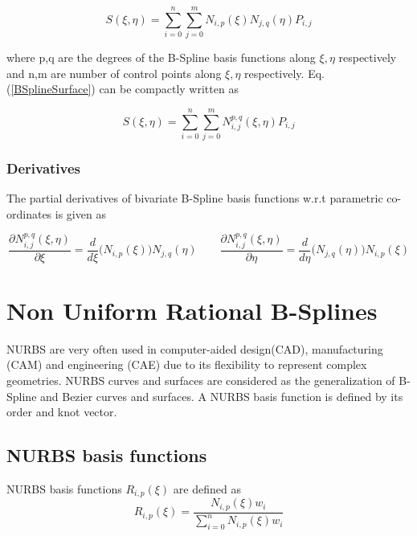 \documentclass[11pt]{article}
\begin{document}
\begin{equation} \label{BSplineSurface}
S(\xi,\eta) = \sum_{i=0}^{n}\sum_{j=0}^{m} N_{i,p}(\xi) N_{j,q}(\eta) P_{i,j}
\end{equation}

\noindent
where
p,q are the degrees of the B-Spline basis functions along $\xi,\eta$
respectively and n,m are number of control points along $\xi,\eta$ respectively.
\noindent
Eq. (\ref{BSplineSurface}) can be compactly written as


\begin{equation} \label{BSplineSurface}
S(\xi,\eta) = \sum_{i=0}^{n}\sum_{j=0}^{m} N_{i,j}^{p,q}(\xi,\eta) P_{i,j}
\end{equation}

\subsubsection{Derivatives}

The partial derivatives of bivariate B-Spline basis functions w.r.t parametric
co-ordinates is given as \cite{nguyen2012introduction}

\begin{equation} 
\frac{\partial N_{i,j}^{p,q}(\xi,\eta)}{\partial \xi} = \frac{d}{d\xi}
\bigg(N_{i,p}(\xi)\bigg)N_{j,q}(\eta) 
\qquad
\frac{\partial N_{i,j}^{p,q}(\xi,\eta)}{\partial \eta} = \frac{d}{d\eta}
\bigg(N_{j,q}(\eta)\bigg)N_{i,p}(\xi)
\end{equation}


\section{Non Uniform Rational B-Splines } \label{NURBS}
NURBS are very often used in computer-aided design(CAD), manufacturing (CAM) and
engineering (CAE) due to its flexibility to represent complex geometries. NURBS
curves and surfaces are considered as the generalization of B-Spline and Bezier
curves and surfaces. A NURBS basis function is defined by its order and knot
vector.

\subsection{NURBS basis functions}
NURBS basis functions $R_{i,p}(\xi)$ are defined as \cite{piegl2012nurbs}
\begin{equation}\label{NURBSBasisFuncs}
R_{i,p}(\xi) = \frac{N_{i,p}(\xi)w_{i}}{\sum_{i=0}^{n}N_{i,p}(\xi)w_{i}}
\end{equation}
\end{document}
